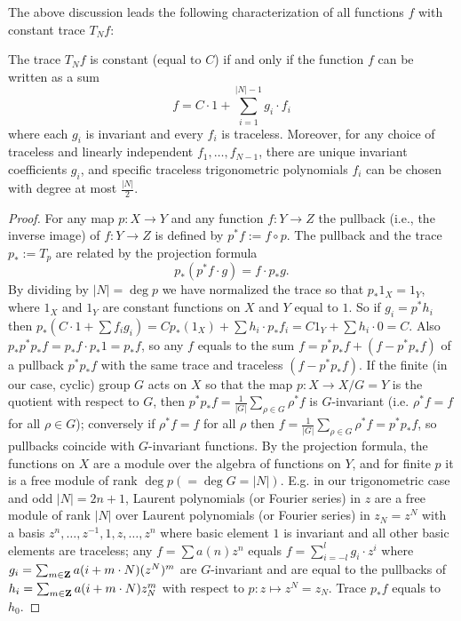 The above discussion leads the following characterization
of all functions $f$ with constant trace $T_N f$:
\begin{theorem} \label{:characterization}
The trace $T_N f$ is constant (equal to $C$) if and only if the function $f$
can be written as a sum
\[ f = C\cdot 1 + \sum_{i=1}^{|N|-1} g_i \cdot f_i \]
where each $g_i$ is invariant
and every $f_i$ is traceless.
Moreover, for any choice of traceless and linearly independent $f_1,\dots,f_{N-1}$,
there are unique invariant coefficients $g_i$, and specific traceless trigonometric polynomials $f_i$ can be chosen with degree at most $\frac{|N|}2$.
\end{theorem}
\begin{proof}
For any map $p: X\to Y$ and any function $f: Y\to Z$
the pullback (i.e., the inverse image) of $f: Y\to Z$ is defined by
$p^* f := f \circ p$.
The pullback and the trace $p_* := T_p$ are related by the projection formula
\begin{equation}
p_* (p^* f \cdot g) = f \cdot p_* g.
\end{equation}
By dividing by $|N|=\deg p$ we have normalized the trace
so that $p_* 1_X = 1_Y$,
where $1_X$ and $1_Y$ are constant functions on $X$ and $Y$ equal to $1$.
So if $g_i = p^* h_i$ then
$p_* (C\cdot 1 + \sum  f_i g_i) = C p_*(1_X) + \sum h_i \cdot p_* f_i = C 1_Y + \sum h_i \cdot 0 = C$.
Also $p_* p^* p_* f = p_* f \cdot p_* 1 = p_* f$, so any $f$ equals to the
sum $f = p^* p_* f + (f-p^* p_* f)$ of a pullback $p^* p_* f$
with the same trace and traceless $(f-p^* p_* f)$.
If the finite (in our case, cyclic) group $G$ acts on $X$ so
that the map $p: X\to X/G = Y$ is the quotient with respect to $G$,
then $p^* p_* f = \frac{1}{|G|} \sum_{ρ\in G} ρ^* f$ is $G$-invariant
(i.e. $ρ^* f = f$ for all $ρ\in G$);
conversely if $ρ^* f = f$ for all $ρ$ then
$f = \frac{1}{|G|} \sum_{ρ\in G} ρ^* f = p^* p_* f$,
so pullbacks coincide with $G$-invariant functions.
By the projection formula, the functions on $X$ are a module
over the algebra of functions on $Y$,
and for finite $p$ it is a free module of rank $\deg p (=\deg G = |N|)$.
E.g. in our trigonometric case and odd $|N|=2n+1$, Laurent polynomials (or Fourier series) in $z$
are a free module of rank $|N|$ over Laurent polynomials (or Fourier series) in $z_N=z^N$
with a basis $z^n,\dots,z^{-1},1,z,\dots,z^n$
where basic element $1$ is invariant and all other basic elements are traceless;
any $f = \sum a(n) z^n$ equals
$f = \sum_{i=-l}^l g_i\cdot z^i$
where
$g_i = \sum_{m\in\mathbf{Z}} a(i + m\cdot N) (z^{N})^m$
are $G$-invariant and are equal to the pullbacks of
$ h_i = \sum_{m\in\mathbf{Z}} a(i + m\cdot N) z_N^m $
with respect to $p : z \mapsto z^N = z_N$.
Trace $p_* f$ equals to $h_0$.
\end{proof}

